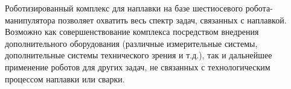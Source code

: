 Роботизированный комплекс для наплавки на базе шестиосевого робота-манипулятора позволяет охватить весь спектр задач, связанных с наплавкой.
Возможно как совершенствование комплекса посредством внедрения дополнительного оборудования (различные измерительные системы, дополнительные системы технического зрения и т.д.), так и дальнейшее применение роботов для других задач, не связанных с технологическим процессом наплавки или сварки.
